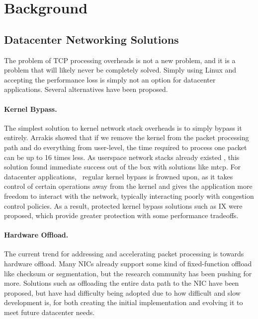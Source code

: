 \section{Background}\label{Background}

\subsection{Datacenter Networking Solutions}

The problem of TCP processing overheads is not a new problem, and it is a 
problem that will likely never be completely solved. Simply using Linux and
accepting the performance loss is simply not an option for datacenter 
applications. Several alternatives have been proposed.

\paragraph{Kernel Bypass.} 

The simplest solution to kernel network stack overheads is to simply bypass
it entirely. Arrakis \cite{peter:arrakis} showed that if we remove the kernel
from the packet processing path and do everything from user-level, the time 
required to process one packet can be up to 16 times less. As userspace network
stacks already existed \cite{lwip}, this solution found immediate success out of
the box with solutions like mtcp\cite{mtcp}. For datacenter applications, \
regular kernel bypass is frowned upon, as it takes control of certain operations
away from the kernel and gives the application more freedom to interact with the
network, typically interacting poorly with congestion control policies. As a 
result, protected kernel bypass solutions such as IX \cite{belay:ix} were 
proposed, which provide greater protection with some performance tradeoffs. 

\paragraph{Hardware Offload.}

The current trend for addressing and accelerating packet processing is towards
hardware offload\cite{chelsio_toe}. Many NICs already support some kind of 
fixed-function offload like checksum or segmentation, but the research community
has been pushing for more. Solutions such as offloading the entire data path to 
the NIC have been proposed, but have had difficulty being adopted due to how 
difficult and slow development is, for both creating the initial implementation 
and evolving it to meet future datacenter needs. 

